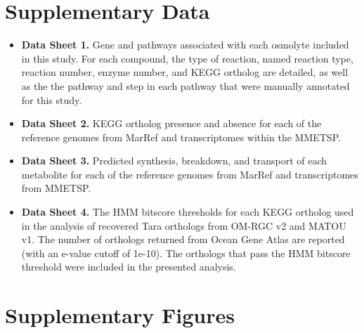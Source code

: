 \documentclass[utf8]{frontiers_suppmat} %
\begin{document}
\onecolumn
{}

\title[Supplementary Material]{{}}

\maketitle

\section{Supplementary Data}
\begin{itemize}
    \item \textbf{Data Sheet 1.} Gene and pathways associated with each osmolyte included in this study. For each compound, the type of reaction, named reaction type, reaction number, enzyme number, and KEGG ortholog are detailed, as well as the the pathway and step in each pathway that were manually annotated for this study. 
    \item \textbf{Data Sheet 2.} KEGG ortholog presence and absence for each of the reference genomes from MarRef and transcriptomes within the MMETSP. 
    \item \textbf{Data Sheet 3.} Predicted synthesis, breakdown, and transport of each metabolite for each of the reference genomes from MarRef and transcriptomes from MMETSP.
    \item \textbf{Data Sheet 4.} The HMM bitscore thresholds for each KEGG ortholog used in the analysis of recovered Tara orthologs from OM-RGC v2 and MATOU v1. The number of orthologs returned from Ocean Gene Atlas are reported (with an e-value cutoff of 1e-10). The orthologs that pass the HMM bitscore threshold were included in the presented analysis. 
    
\end{itemize}
\section{Supplementary Figures}
\end{document}
